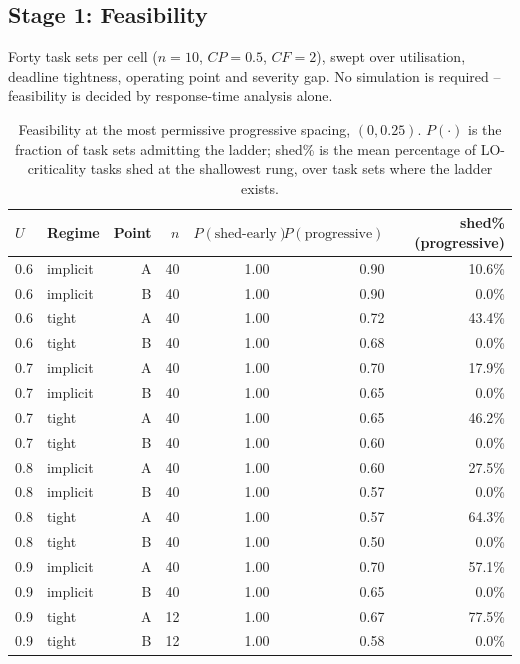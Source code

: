 \subsection{Stage 1: Feasibility}
\label{sec:feasibility-results}

Forty task sets per cell ($n=10$, $CP=0.5$, $CF=2$), swept over utilisation,
deadline tightness, operating point and severity gap. No simulation is
required -- feasibility is decided by response-time analysis alone.

\begin{table}[h]
\centering
\caption{Feasibility at the most permissive progressive spacing, $(0, 0.25)$.
$P(\cdot)$ is the fraction of task sets admitting the ladder; shed\% is the
mean percentage of LO-criticality tasks shed at the shallowest rung, over task
sets where the ladder exists.}
\label{tab:feasibility}
\begin{tabular}{llrrrrr}
\toprule
$U$ & Regime & Point & $n$ & $P(\text{shed-early})$ & $P(\text{progressive})$ & shed\%(progressive) \\
\midrule
0.6 & implicit & A & 40 & 1.00 & 0.90 & 10.6\% \\
0.6 & implicit & B & 40 & 1.00 & 0.90 & 0.0\% \\
0.6 & tight    & A & 40 & 1.00 & 0.72 & 43.4\% \\
0.6 & tight    & B & 40 & 1.00 & 0.68 & 0.0\% \\
0.7 & implicit & A & 40 & 1.00 & 0.70 & 17.9\% \\
0.7 & implicit & B & 40 & 1.00 & 0.65 & 0.0\% \\
0.7 & tight    & A & 40 & 1.00 & 0.65 & 46.2\% \\
0.7 & tight    & B & 40 & 1.00 & 0.60 & 0.0\% \\
0.8 & implicit & A & 40 & 1.00 & 0.60 & 27.5\% \\
0.8 & implicit & B & 40 & 1.00 & 0.57 & 0.0\% \\
0.8 & tight    & A & 40 & 1.00 & 0.57 & 64.3\% \\
0.8 & tight    & B & 40 & 1.00 & 0.50 & 0.0\% \\
0.9 & implicit & A & 40 & 1.00 & 0.70 & 57.1\% \\
0.9 & implicit & B & 40 & 1.00 & 0.65 & 0.0\% \\
0.9 & tight    & A & 12 & 1.00 & 0.67 & 77.5\% \\
0.9 & tight    & B & 12 & 1.00 & 0.58 & 0.0\% \\
\bottomrule
\end{tabular}
\end{table}

